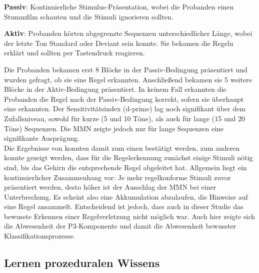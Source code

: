 \documentclass[doc,a4paper,12pt]{apa6}
\begin{document}
\begin{compactitem}
  \item \textbf{Passiv}: Kontinuierliche Stimulus-Präsentation, wobei die Probanden einen Stummfilm schauten und die Stimuli ignorieren sollten.
  \item \textbf{Aktiv}: Probanden hörten abgegrenzte Sequenzen unterschiedlicher Länge, wobei der letzte Ton Standard oder Deviant sein konnte. Sie bekamen die Regeln erklärt und sollten per Tastendruck reagieren.
\end{compactitem}

Die Probanden bekamen erst 8 Blöcke in der Passiv-Bedingung präsentiert und wurden gefragt, ob sie eine Regel erkannten. Anschließend bekamen sie 5 weitere Blöcke in der Aktiv-Bedingung präsentiert. In keinem Fall erkannten die Probanden die Regel nach der Passiv-Bedingung korrekt, sofern sie überhaupt eine erkannten. Der Sensitivitätsindex (d-prime) lag noch signifikant über dem Zufallsniveau, sowohl für kurze (5 und 10 Töne), als auch für lange (15 und 20 Töne) Sequenzen. Die MMN zeigte jedoch nur für lange Sequenzen eine signifikante Ausprägung.\\
Die Ergebnisse von \textcite{paavilainen2007preattentive} konnten damit zum einen bestätigt werden, zum anderen konnte gezeigt werden, dass für die Regelerkennung zunächst einige Stimuli nötig sind, bis das Gehirn die entsprechende Regel abgeleitet hat. Allgemein liegt ein kontinuierlicher Zusammenhang vor: Je mehr regelkonforme Stimuli zuvor präsentiert werden, desto höher ist der Ausschlag der MMN bei einer Unterbrechung. Es scheint also eine Akkumulation abzulaufen, die Hinweise auf eine Regel ansammelt. Entscheidend ist jedoch, dass auch in dieser Studie das bewusste Erkennen einer Regelverletzung nicht möglich war. Auch hier zeigte sich die Abwesenheit der P3-Komponente und damit die Abwesenheit bewusster Klassifikationsprozesse.

\subsection{Lernen prozeduralen Wissens}
\end{document}
